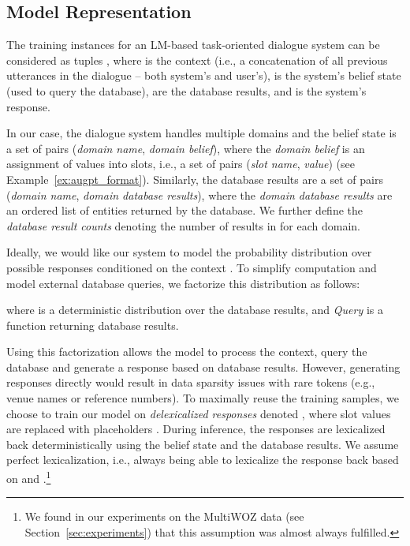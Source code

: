 \documentclass[11pt]{article}
\newcommand{\exampleref}[1]{Example~\ref{#1}}
\begin{document}
\subsection{Model Representation}
\label{sec:model-repres}

The training instances for an LM-based task-oriented dialogue system can be considered as tuples , where  is the context (i.e., a concatenation of all previous utterances in the dialogue – both system's and user's),  is the system's belief state (used to query the database),  are the database results, and  is the system's response. 

In our case, the dialogue system handles multiple domains and the belief state is a set of pairs (\emph{domain name}, \emph{domain belief}), where the \emph{domain belief} is an assignment of values into slots, i.e., a set of pairs (\textit{slot name}, \textit{value}) (see \exampleref{ex:augpt_format}). Similarly, the database results  are a set of pairs (\textit{domain name}, \textit{domain database results}), where the \textit{domain database results} are an ordered list of entities returned by the database. We further define the \emph{database result counts}  denoting the number of results in  for each domain.

Ideally, we would like our system to model the probability distribution over possible responses conditioned on the context . To simplify computation and model external database queries, we factorize this distribution as follows:

where  is a deterministic distribution over the database results, and \textit{Query} is a function returning database results.

Using this factorization allows the model to process the context, query the database and generate a response based on database results.
However, generating responses directly would result in data sparsity issues with rare tokens (e.g., venue names or reference numbers).
To maximally reuse the training samples, we choose to train our model on \emph{delexicalized responses}  denoted , where slot values are replaced with placeholders \cite{wen2015}. During inference, the responses are lexicalized back deterministically using the belief state and the database results. We assume perfect lexicalization, i.e., always being able to lexicalize the response  back based on  and .\footnote{We found in our experiments on the MultiWOZ data (see Section~\ref{sec:experiments}) that this assumption was almost always fulfilled.}
\end{document}
